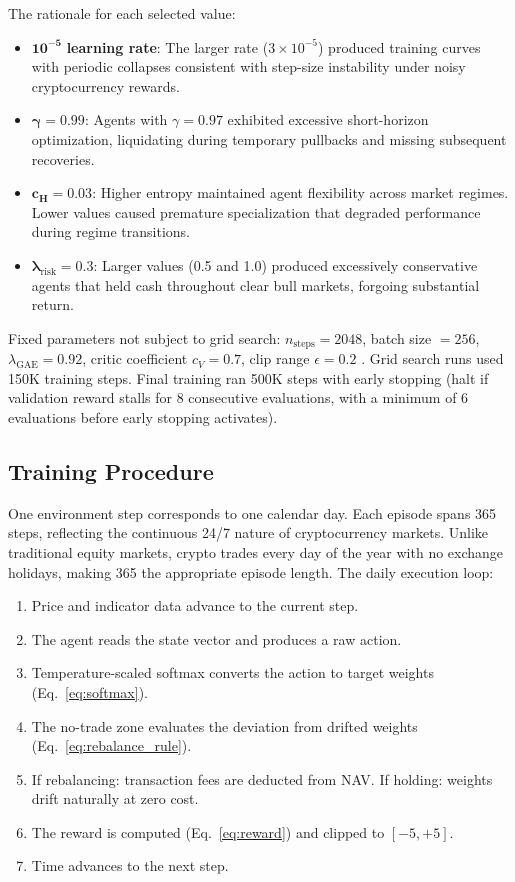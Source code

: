 \documentclass[pdflatex,sn-mathphys-num]{sn-jnl}
\begin{document}
The rationale for each selected value:

\begin{itemize}[leftmargin=*]
\item $\mathbf{10^{-5}}$ \textbf{learning rate}: The larger rate ($3 \times 10^{-5}$) produced training curves with periodic collapses consistent with step-size instability under noisy cryptocurrency rewards.
\item $\boldsymbol{\gamma} = \mathbf{0.99}$: Agents with $\gamma = 0.97$ exhibited excessive short-horizon optimization, liquidating during temporary pullbacks and missing subsequent recoveries.
\item $\mathbf{c_H} = \mathbf{0.03}$: Higher entropy maintained agent flexibility across market regimes. Lower values caused premature specialization that degraded performance during regime transitions.
\item $\boldsymbol{\lambda}_{\mathrm{risk}} = \mathbf{0.3}$: Larger values (0.5 and 1.0) produced excessively conservative agents that held cash throughout clear bull markets, forgoing substantial return.
\end{itemize}

Fixed parameters not subject to grid search: $n_{\mathrm{steps}} = 2048$,
batch size $= 256$, $\lambda_{\mathrm{GAE}} = 0.92$, critic coefficient
$c_V = 0.7$, clip range $\epsilon = 0.2$ \cite{schulman2017proximal}.
Grid search runs used 150K training steps. Final training ran 500K steps
with early stopping (halt if validation reward stalls for 8 consecutive
evaluations, with a minimum of 6 evaluations before early stopping activates).

\subsection{Training Procedure}

One environment step corresponds to one calendar day. Each episode spans
365 steps, reflecting the continuous 24/7 nature of cryptocurrency markets.
Unlike traditional equity markets, crypto trades every day of the year with
no exchange holidays, making 365 the appropriate episode length. The daily
execution loop:

\begin{enumerate}[leftmargin=*]
\item Price and indicator data advance to the current step.
\item The agent reads the state vector and produces a raw action.
\item Temperature-scaled softmax converts the action to target weights (Eq.~\ref{eq:softmax}).
\item The no-trade zone evaluates the deviation from drifted weights (Eq.~\ref{eq:rebalance_rule}).
\item If rebalancing: transaction fees are deducted from NAV. If holding: weights drift naturally at zero cost.
\item The reward is computed (Eq.~\ref{eq:reward}) and clipped to $[-5, +5]$.
\item Time advances to the next step.
\end{enumerate}
\end{document}
